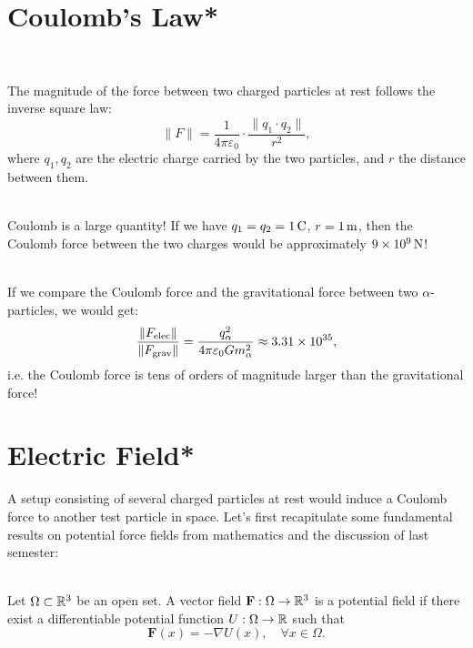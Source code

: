 \section{Coulomb's Law*}
\begin{law}
    \ \\\begin{minipage}{0.6 \linewidth}
        \vspace{3pt} The magnitude of the force between two charged particles at rest follows the inverse square law:
        $$\lVert F\rVert=\frac{1}{4\pi\varepsilon_0}\cdot\frac{\lVert q_1\cdot q_2\rVert}{r^2}, $$
        where $q_1, q_2$ are the electric charge carried by the two particles, and $r$ the distance between them.
    \end{minipage}
    \begin{minipage}{0.4 \linewidth}
        \centering
    \end{minipage}
\end{law}
\vspace{-12pt}
\begin{remark}
    \ \\Coulomb is a large quantity! If we have $q_1=q_2=1\,\rm{C}$, $r=1\,\rm{m}$, then the Coulomb force between the two charges would be approximately $9\times10^9\,\rm{N}$!
\end{remark}
\vspace{-12pt}
\begin{example}
    \ \\If we compare the Coulomb force and the gravitational force between two $\alpha$-particles, we would get:
    $$\frac{\lVert F_{\rm{elec}}\rVert}{\lVert F_{\rm{grav}}\rVert}=\frac{q_\alpha^2}{4\pi\varepsilon_0Gm_\alpha^2}\approx3.31\times10^{35},$$
    i.e. the Coulomb force is tens of orders of magnitude larger than the gravitational force!
\end{example}
\section{Electric Field*}
A setup consisting of several charged particles at rest would induce a Coulomb force to another test particle in space. Let's first recapitulate some fundamental results on potential force fields from mathematics and the discussion of last semester:
\begin{definition}
    \ \\Let $\Omega\subset\mathbb{R}^3$ be an open set. A vector field $\mathbf{F}: \Omega\to\mathbb{R}^3$ is a potential field if there exist a differentiable potential function $U: \Omega\to\mathbb{R}$ such that
    \[\mathbf{F}(x)=-\nabla U(x),\quad\forall x\in\Omega.\]
\end{definition}